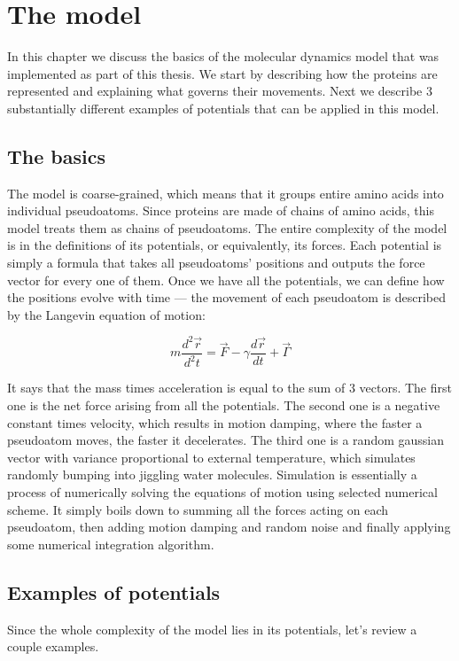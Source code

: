\chapter{The model}\label{c:model}

In this chapter we discuss the basics of the molecular dynamics model that was implemented as part of this thesis. We start by describing how the proteins are represented and explaining what governs their movements. Next we describe 3 substantially different examples of potentials that can be applied in this model.

\section{The basics} 
The model is coarse-grained, which means that it groups entire amino acids into individual pseudoatoms. Since proteins are made of chains of amino acids, this model treats them as chains of pseudoatoms. The entire complexity of the model is in the definitions of its potentials, or equivalently, its forces. Each potential is simply a formula that takes all pseudoatoms' positions and outputs the force vector for every one of them. Once we have all the potentials, we can define how the positions evolve with time --- the movement of each pseudoatom is described by the Langevin equation of motion:

$$ m\frac{d^2 \vec{r}}{d^2t} = \vec{F} - \gamma \frac{d\vec{r}}{dt} + \vec{\Gamma}$$

It says that the mass times acceleration is equal to the sum of 3 vectors. The first one is the net force arising from all the potentials. The second one is a negative constant times velocity, which results in motion damping, where the faster a pseudoatom moves, the faster it decelerates. The third one is a random gaussian vector with variance proportional to external temperature, which simulates randomly bumping into jiggling water molecules. Simulation is essentially a process of numerically solving the equations of motion using selected numerical scheme. It simply boils down to summing all the forces acting on each pseudoatom, then adding motion damping and random noise and finally applying some numerical integration algorithm. 

\section{Examples of potentials}
Since the whole complexity of the model lies in its potentials, let's review a couple examples.

